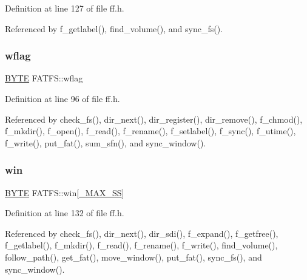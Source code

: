 Definition at line 127 of file ff.\+h.



Referenced by f\+\_\+getlabel(), find\+\_\+volume(), and sync\+\_\+fs().

\mbox{\label{structFATFS_a647e43c9ccae94b7274793d1909897de}} 
\subsubsection{\texorpdfstring{wflag}{wflag}}
{\footnotesize\ttfamily \hyperlink{integer_8h_a4ae1dab0fb4b072a66584546209e7d58}{B\+Y\+TE} F\+A\+T\+F\+S\+::wflag}



Definition at line 96 of file ff.\+h.



Referenced by check\+\_\+fs(), dir\+\_\+next(), dir\+\_\+register(), dir\+\_\+remove(), f\+\_\+chmod(), f\+\_\+mkdir(), f\+\_\+open(), f\+\_\+read(), f\+\_\+rename(), f\+\_\+setlabel(), f\+\_\+sync(), f\+\_\+utime(), f\+\_\+write(), put\+\_\+fat(), sum\+\_\+sfn(), and sync\+\_\+window().

\mbox{\label{structFATFS_a7cc35a593465e727ab87723c14610644}} 
\subsubsection{\texorpdfstring{win}{win}}
{\footnotesize\ttfamily \hyperlink{integer_8h_a4ae1dab0fb4b072a66584546209e7d58}{B\+Y\+TE} F\+A\+T\+F\+S\+::win\mbox{[}\hyperlink{ffconf_8h_ac271b697378912f17132cb9c7d0de024}{\+\_\+\+M\+A\+X\+\_\+\+SS}\mbox{]}}



Definition at line 132 of file ff.\+h.



Referenced by check\+\_\+fs(), dir\+\_\+next(), dir\+\_\+sdi(), f\+\_\+expand(), f\+\_\+getfree(), f\+\_\+getlabel(), f\+\_\+mkdir(), f\+\_\+read(), f\+\_\+rename(), f\+\_\+write(), find\+\_\+volume(), follow\+\_\+path(), get\+\_\+fat(), move\+\_\+window(), put\+\_\+fat(), sync\+\_\+fs(), and sync\+\_\+window().

\mbox{\label{structFATFS_ac60e69c00e6bf7c25febfbac4dc1476b}} 
